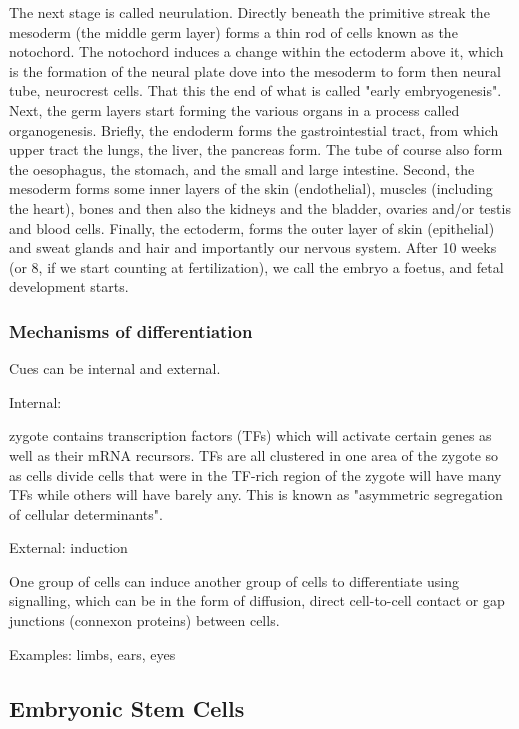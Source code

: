 The next stage is called neurulation.
Directly beneath the primitive streak the mesoderm (the middle germ layer) forms a thin rod of cells known as the notochord.
The notochord induces a change within the ectoderm above it, which is the formation of the neural plate dove into the mesoderm to form then neural tube, neurocrest cells.
That this the end of what is called "early embryogenesis".\\


Next, the germ layers start forming the various organs in a process called organogenesis.
Briefly, the endoderm forms the gastrointestial tract, from which upper tract the lungs, the liver, the pancreas form. 
The tube of course also form the oesophagus, the stomach, and the small and large intestine.
Second, the mesoderm forms some inner layers of the skin (endothelial), muscles (including the heart), bones and then also the kidneys and the bladder, ovaries and/or testis and blood cells.
Finally, the ectoderm, forms the outer layer of skin (epithelial) and sweat glands and hair and importantly our nervous system.
After 10 weeks (or 8, if we start counting at fertilization), we call the embryo a foetus, and fetal development starts.

\subsubsection{Mechanisms of differentiation}

Cues can be internal and external.

Internal:

zygote contains transcription factors (TFs) which will activate certain genes as well as their mRNA recursors.
TFs are all clustered in one area of the zygote so as cells divide cells that were in the TF-rich region of the zygote will have many TFs while others will have barely any.
This is known as "asymmetric segregation of cellular determinants".

External: induction

One group of cells can induce another group of cells to differentiate using signalling, which can be in the form of diffusion, direct cell-to-cell contact or gap junctions (connexon proteins) between cells.

Examples: limbs, ears, eyes

\subsection{Embryonic Stem Cells}

